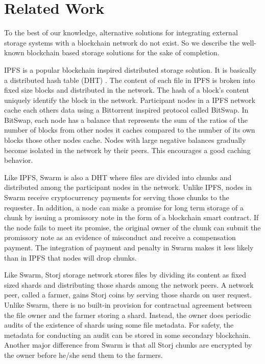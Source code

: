        
\section{Related Work}
\label{s-rw}
To the best of our knowledge, alternative solutions for integrating external storage systems with a blockchain network do not exist. So we describe the well-known blockchain based storage solutions for the sake of completion.   

IPFS \cite{ipfs} is a popular blockchain inspired distributed storage solution. It is basically a distributed hash table (DHT) \cite{Maymounkov:2002:KPI:646334.687801}. The content of each file in IPFS is broken into fixed size blocks and distributed in the network. The hash of a block's content uniquely identify the block in the network. Participant nodes in a IPFS network cache each others data using a Bittorrent \cite{Pouwelse:2005:BPF:2138958.2138984} inspired protocol called BitSwap. In BitSwap, each node has a balance that represents the sum of the ratios of the number of blocks from other nodes it caches compared to the number of its own blocks those other nodes cache. Nodes with large negative balances gradually become isolated in the network by their peers. This encourages a good caching behavior.

Like IPFS, Swarm \cite{swarm} is also a DHT where files are divided into chunks and distributed among the participant nodes in the network. Unlike IPFS, nodes in Swarm receive cryptocurrency payments for serving those chunks to the requester. In addition, a node can make a promise for long term storage of a chunk by issuing a promissory note in the form of a blockchain smart contract. If the node fails to meet its promise, the original owner of the chunk can submit the promissory note as an evidence of misconduct and receive a compensation payment. The integration of payment and penalty in Swarm makes it less likely than in IPFS that nodes will drop chunks.                      

Like Swarm, Storj \cite{Wilkinson14storja} storage network stores files by dividing its content as fixed sized shards and distributing those shards among the network peers. A network peer, called a  farmer, gains Storj coins by serving those shards on user request. Unlike Swarm, there is no built-in provision for contractual agreement between the file owner and the farmer storing a shard. Instead, the owner does periodic audits of the existence of shards using some file metadata. For safety, the metadata for conducting an audit can be stored in some secondary blockchain. Another major difference from Swarm is that all Storj chunks are encrypted by the owner before he/she send them to the farmers.         

